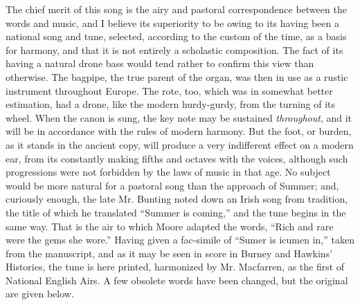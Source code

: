 The chief merit of this song is the airy and pastoral correspondence between
the words and music, and I believe its superiority to be owing to its having been
a national song and tune, selected, according to the custom of the time, as a basis
for harmony, and that it is not entirely a scholastic composition. The fact of its
having a natural drone bass would tend rather to confirm this view than otherwise.
The bagpipe, the true parent of the organ, was then in use as a rustic instrument
throughout Europe. The rote, too, which was in somewhat better estimation, had
a drone, like the modern hurdy-gurdy, from the turning of its wheel. When the
canon is sung, the key note may be sustained \textit{throughout}, and it will be in accordance
with the rules of modern harmony. But the foot, or burden, as it stands
in the ancient copy, will produce a very indifferent effect on a modern ear, %
from its
constantly making fifths and octaves with the voices, although such progressions
were not forbidden by the laws of music in that age. No subject would be more
natural for a pastoral song than the approach of Summer; and, curiously enough,
the late Mr. Bunting noted down an Irish song from tradition, the title of
which he translated “Summer is coming,” and the tune begins in the same way.
That is the air to which Moore adapted the words, “Rich and rare were the gems 
she wore.” Having given a fac-simile of \pagebreak
“Sumer is icumen in,” taken from the 
manuscript, and as it may be seen in score in Burney and Hawkins’ Histories, 
the tune is here printed, harmonized by Mr. Macfarren, as the first of National
English Airs. A few obsolete words have been changed, but the original are
given below.

\renewcommand\versoheader{sumer is icumen in.}
\renewcommand\rectoheader{songs with music---thirteenth century.}




